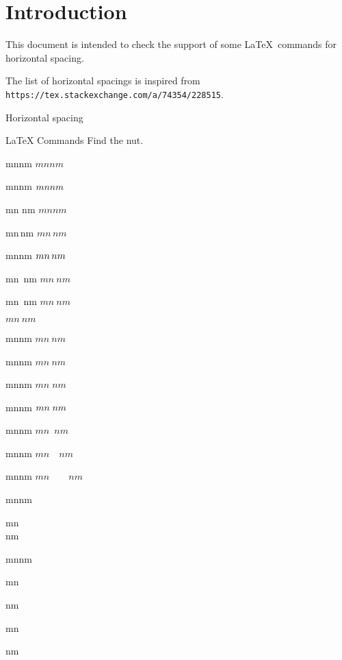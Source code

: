 \documentclass{article}
\begin{document}
\section*{Introduction}

This document is intended to check the support of some \LaTeX\ commands for 
horizontal spacing.

The list of horizontal spacings is inspired from 
\texttt{https://tex.stackexchange.com/a/74354/228515}.

\begin{quiz}[points=1]{Horizontal spacing}
\begin{multi}[shuffle=false]{LaTeX Commands}
Find the nut.
\item mnnm \quad $mnnm$
\item mn\space nm \quad $mn\space nm$
\item mn nm \quad $mn nm$
\item mn\,nm \quad $mn\,nm$
\item mn\thinspace nm \quad $ mn\thinspace nm$
\item mn~nm \quad $mn~nm$
\item mn\ nm \quad $mn\ nm$
\item $mn\>nm$ %
\item mn\:nm \quad $mn\:nm$
\item mn\medspace nm \quad $mn\medspace nm$
\item mn\;nm \quad $mn\;nm$
\item mn\thickspace nm \quad $mn\thickspace nm$
\item* mn\enspace nm \quad $mn\enspace nm$
\item mn\quad nm \quad $mn\quad nm$
\item mn\qquad nm \quad $mn\qquad nm$
\item mn\textvisiblespace nm
\item mn\\nm
\item mn\newline nm
\item mn%

nm
\item mn\par nm
\end{multi}
\end{quiz}
\end{document}
